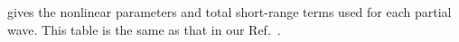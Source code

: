 \documentclass[Dissertation.tex]{subfiles}
\begin{document}
 gives the nonlinear parameters and total short-range
terms used for each partial wave. This table is the same as that in our
Ref.~\cite{Woods2015}.


%
\end{document}
